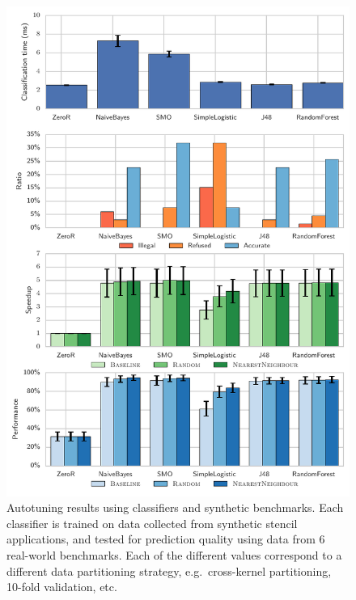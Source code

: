 \documentclass[nonatbib,preprint,10pt]{sigplanconf}
\begin{document}
\begin{figure}
\centering
\includegraphics[width=\columnwidth]{img/classification-syn-real}
\caption[Classification results using synthetic benchmarks]{%
  Autotuning results using classifiers and synthetic benchmarks. Each
  classifier is trained on data collected from synthetic stencil
  applications, and tested for prediction quality using data from 6
  real-world benchmarks. Each of the different values correspond to a
  different data partitioning strategy, e.g.\ cross-kernel
  partitioning, 10-fold validation, etc.%
}
\label{fig:class-syn}
\end{figure}

\end{document}
